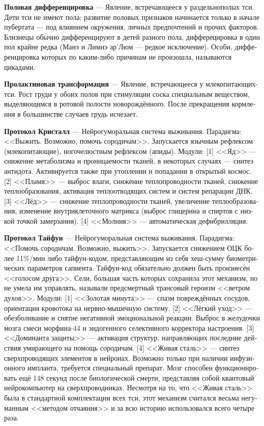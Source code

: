 \documentclass[a4paper,12pt,fleqn]{book}\usepackage{cooltooltips}\usepackage{polyglossia}\setdefaultlanguage[babelshorthands=true]{russian}\setotherlanguage{english}\defaultfontfeatures{Ligatures=TeX,Mapping=tex-text} \usepackage{xcolor}\definecolor{lightgray}{HTML}{bbbbbb}\color{lightgray}\newcommand{\ml}[3]{\textenglish{\textcolor{black}{#3}}}
\newcommand{\theterm}[3]{\textbf{\hypertarget{#1}{#2}} --- #3}
\begin{document}
\theterm{differentiation}
{Половая дифференцировка}
{Явление, встречающееся у раздельнополых тси.
Дети тси не имеют пола;
развитие половых признаков начинается только в начале пубертата --- под влиянием окружения, личных предпочтений и прочих факторов.
Близнецы обычно дифференцируют в детей разного пола, дифферецировка в один пол крайне редка (Манэ и Лимнэ ар'Люм --- редкое исключение).
Особи, дифференцировка которых по каким-либо причинам не произошла, называются цикадами.}

\theterm{prolactin-transformation}
{Пролактиновая трансформация}
{Явление, встречающееся у млекопитающих-тси.
Рост груди у обоих полов при стимуляции соска специальным веществом, выделяющимся в ротовой полости новорождённого.
После прекращения кормления в большинстве случаев грудь исчезает.}

\theterm{protocol-crystall}
{Протокол Кристалл}
{Нейрогуморальная система выживания.
Парадигма: <<Выжить.
Возможно, помочь сородичам>>.
Запускается язычным рефлексом (млекопитающие), ногочелюстным рефлексом (апиды).
Модули:
[1] <<Яд>> --- снижение метаболизма и проницаемости тканей, в некоторых случаях --- синтез антидота.
Активируется также при утоплении и попадании в открытый космос.
[2] <<Пламя>> --- выброс влаги, снижение теплопроводности тканей, снижение теплообразования, активация теплоотводящих систем и систем репарации ДНК.
[3] <<Лёд>> --- снижение теплопроводности тканей, увеличение теплообразования, изменение внутриклеточного матрикса (выброс глицерина и спиртов с низкой точкой замерзания).
[4] <<Молния>> --- автоматическая дефибрилляция.}

\theterm{protocol-taifeng}
{Протокол Тайфун}
{Нейрогуморальная система выживания.
Парадигма: <<Помочь сородичам.
Возможно, выжить>>.
Запускается снижением ОЦК более 11\%/мин либо тайфун-кодом, представляющим из себя хеш-сумму биометрических параметров сапиента.
Тайфун-код обязательно должен быть произнесён <<голосом друга>>.
Сели, большая часть которых сохранила этот механизм, но не умела им управлять, называли предсмертный трансовый героизм <<ветром духов>>.
Модули:
[1] <<Золотая минута>> --- спазм повреждённых сосудов, ориентация кровотока на нервно-мышечную систему.
[2] <<Лёгкий уход>> --- обезболивание и снятие негативной эмоциональной реакции.
Выброс в желудочки мозга смеси морфина-44 и эндогенного селективного корректора настроения.
[3] <<Доминанта защиты>> --- активация структур, направляющих последние действия умирающего на помощь сородичам.
[4] <<Живая сталь>> --- синтез сверхпроводящих элементов в нейронах.
Возможно только при наличии инфузионного импланта, требуется специальный препарат.
Мозг способен функционировать ещё 148 секунд после биологической смерти, представляя собой квантовый нейрокомпьютер на сверхпроводниках.
Несмотря на то, что <<Живая сталь>> была в стандартной комплектации всех тси, этот механизм считался весьма негуманным <<методом отчаяния>> и за всю историю использовался всего четыре раза.}
\end{document}

